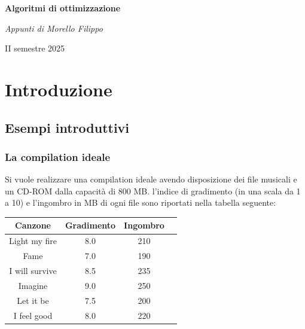 \documentclass[a4paper, 11pt]{article}
\begin{document}
    \begin{titlepage}
        \centering
    
        \vspace{2cm}
        {\Huge\bfseries Algoritmi di ottimizzazione\par}
    
        \vspace{1cm}
        {\Large\itshape Appunti di Morello Filippo\par}
    
        \vfill
        {\large II semestre 2025\par}
    
    \end{titlepage}

    \tableofcontents

    \break
    
    \section{Introduzione}
        \subsection{Esempi introduttivi}
            \subsubsection*{La compilation ideale}
            Si vuole realizzare una compilation ideale avendo disposizione dei file musicali e un CD-ROM dalla capacità di $800$ MB. l’indice di
            gradimento (in una scala da 1 a 10) e l’ingombro in MB di ogni file sono riportati nella tabella seguente: 

            \begin{table}[ht]
                \centering
                \begin{tabular}{|c|c|c|c|}
                \hline
                \textbf{Canzone} & \textbf{Gradimento} & \textbf{Ingombro} \\ \hline
                Light my fire    & 8.0                 & 210               \\
                Fame             & 7.0                 & 190               \\
                I will survive   & 8.5                 & 235               \\
                Imagine          & 9.0                 & 250               \\
                Let it be        & 7.5                 & 200               \\
                I feel good      & 8.0                 & 220               \\ \hline
                \end{tabular}
                \end{table}
           
\end{document}
